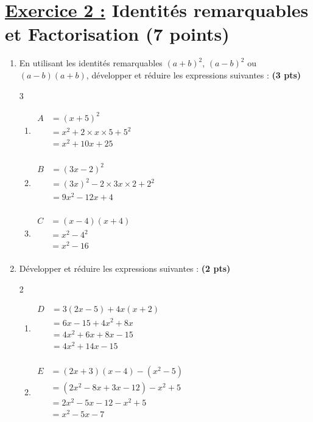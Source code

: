 \documentclass[12pt,a4paper]{article}
\begin{document}
\section*{\underline{Exercice 2 :} Identités remarquables et Factorisation (7 points)}

\begin{enumerate}
    \item En utilisant les identités remarquables $(a+b)^2$, $(a-b)^2$ ou $(a-b)(a+b)$, développer et réduire les expressions suivantes : \textbf{(3 pts)}

\begin{multicols}{3}
\setlength{\columnseprule}{0.1mm}
\begin{enumerate}
\item[]
\(
\begin{aligned}
A&=(x + 5)^2\\
&=x^2 + 2 \times x \times 5 + 5^2\\
&=x^2 + 10x + 25\\
\end{aligned}
\)
\item[]
\(
\begin{aligned}
B&=(3x - 2)^2\\
&=(3x)^2 - 2 \times 3x \times 2 + 2^2\\
&=9x^2 - 12x + 4\\
\end{aligned}
\)
\item[]
\(
\begin{aligned}
C&=(x - 4)(x + 4)\\
&=x^2 - 4^2\\
&=x^2 - 16\\
\end{aligned}
\)
\end{enumerate}
\end{multicols} 
    
\item Développer et réduire les expressions suivantes : \textbf{(2 pts)}
 \begin{multicols}{2}
\setlength{\columnseprule}{0.1mm}
\begin{enumerate}
\item[]
\(
\begin{aligned}
D&=3(2x - 5) + 4x(x + 2)\\
&=6x - 15 + 4x^2 + 8x\\
&=4x^2 + 6x + 8x - 15\\
&=4x^2 + 14x - 15\\
\end{aligned}
\)
\item[]
\(
\begin{aligned}
E&=(2x + 3)(x - 4) - (x^2 - 5)\\
&=(2x^2 - 8x + 3x - 12) - x^2 + 5\\
&=2x^2 - 5x - 12 - x^2 + 5\\
&=x^2 - 5x - 7\\
\end{aligned}
\)
\end{enumerate}
\end{multicols}


\end{enumerate}
\end{document}
